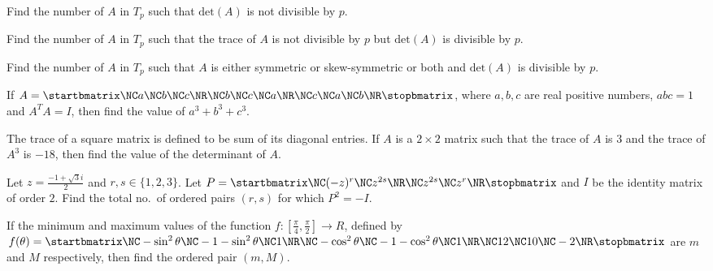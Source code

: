   Find the number of $A$ in $T_p$ such that $\mathrm{det}(A)$ is not divisible by $p$.
\item Find the number of $A$ in $T_p$ such that the trace of $A$ is not divisible by $p$ but
  $\mathrm{det}(A)$ is divisible by $p$.
\item Find the number of $A$ in $T_p$ such that $A$ is either symmetric or skew-symmetric or both and
  $\mathrm{det}(A)$ is divisible by $p$.
\item If $A = \startbmatrix\NC a\NC b\NC c\NR\NC b\NC c\NC a\NR\NC c\NC a\NC b\NR\stopbmatrix$, where $a, b,
  c$ are real positive numbers, $abc = 1$ and $A^TA = I$, then find the value of $a^3 + b^3 + c^3$.
\item The trace of a square matrix is defined to be sum of its diagonal entries. If $A$ is a $2\times2$
  matrix such that the trace of $A$ is $3$ and the trace of $A^3$ is $-18$, then find the value of the
  determinant of $A$.
\item Let $z = \frac{-1 + \sqrt{3}i}{2}$ and $r, s\in\{1, 2, 3\}$. Let $P = \startbmatrix\NC (-z)^r\NC
  z^{2s}\NR\NC z^{2s}\NC z^r\NR\stopbmatrix$ and $I$ be the identity matrix of order $2$. Find the total
  no.\ of ordered pairs $(r, s)$ for which $P^2 = -I$.
\item If the minimum and maximum values of the function $f:\left[\frac{\pi}{4},
  \frac{\pi}{2}\right]\rightarrow R$, defined by $f(\theta) = \startbmatrix\NC -\sin^2\theta\NC -1
  -\sin^2\theta\NC 1\NR\NC -\cos^2\theta\NC -1 - \cos^2\theta\NC 1\NR\NC 12\NC 10\NC -2\NR\stopbmatrix$ are
  $m$ and $M$ respectively, then find the ordered pair $(m,M)$.
\stopitemize
